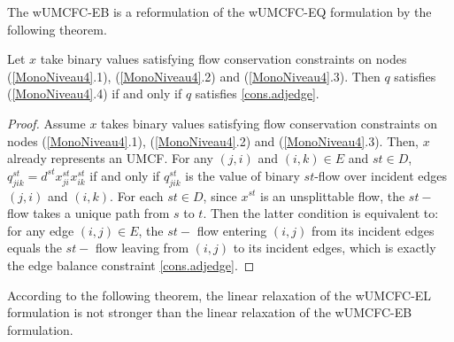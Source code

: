 The wUMCFC-EB is a reformulation of the wUMCFC-EQ formulation by the following theorem.

\begin{theorem}
Let $x$ take binary values satisfying flow conservation constraints on nodes (\ref{MonoNiveau4}.1), (\ref{MonoNiveau4}.2) and (\ref{MonoNiveau4}.3). Then $q$ satisfies (\ref{MonoNiveau4}.4) if and only if  $q$ satisfies \eqref{cons.adjedge}.
\end{theorem}
\begin{proof}
Assume $x$ takes binary values satisfying flow conservation constraints on nodes (\ref{MonoNiveau4}.1), (\ref{MonoNiveau4}.2) and (\ref{MonoNiveau4}.3). Then, $x$ already represents an UMCF. For any $(j,i)$ and $(i,k) \in E$ and $st \in D$,   \(q^{st}_{jik} = d^{st} x^{st}_{ji}  x^{st}_{ik}\)  if and only if $q^{st}_{jik}$ is the value of binary $st$-flow over incident edges $(j,i)$ and $(i,k)$. For each $st \in D$, since $x^{st}$ is an unsplittable flow, the $st-$flow takes a unique path from $s$ to $t$. Then the latter condition is equivalent to: for any edge $(i,j) \in E$, the $st-$ flow entering $(i,j)$ from its incident edges  equals the $st-$ flow leaving from $(i,j)$ to its incident edges, which is  exactly the edge balance constraint \eqref{cons.adjedge}.
\end{proof}

According to the following theorem, the linear relaxation of the wUMCFC-EL formulation is not stronger than the linear relaxation of the wUMCFC-EB formulation.

